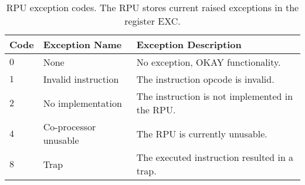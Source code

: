\documentclass[11pt]{article}
\begin{document}
\begin{table}[htbp] \begin{center}
  \caption{RPU exception codes. The RPU stores current raised exceptions in the register EXC.}\label{tab:rpu_exception_codes}
  \begin{tabular}{|m{1.5cm}|m{3.5cm}|m{7cm}|}
    \hline
    \textbf{Code} & \textbf{Exception Name} & \textbf{Exception Description}\\ \hline

    $0$ & None & No exception, OKAY functionality.\\ \hline

    $1$ & Invalid instruction & The instruction opcode is invalid.\\ \hline

    $2$ & No implementation & The instruction is not implemented in the RPU.\\ \hline

    $4$ & Co-processor unusable & The RPU is currently unusable.\\ \hline

    $8$ & Trap & The executed instruction resulted in a trap.\\ \hline
  \end{tabular}
\end{center}
\end{table}
\end{document}
